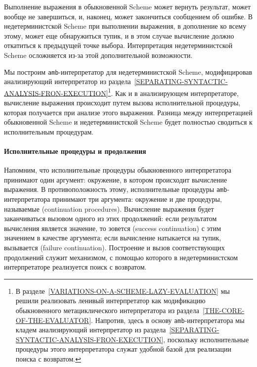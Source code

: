 Выполнение выражения в обыкновенной Scheme может вернуть
результат, может вообще не завершиться, и, наконец, может закончиться сообщением
об ошибке.  В недетерминистской Scheme при выполнении выражения, в
дополнение ко всему этому, может еще обнаружиться тупик, и
в этом случае вычисление должно откатиться к предыдущей точке выбора.
Интерпретация недетерминистской Scheme осложняется из-за этой дополнительной
возможности.

Мы построим {\tt amb}-интерпретатор для
недетерминистской Scheme, модифицировав
анализирующий интерпретатор из
раздела~\ref{SEPARATING-SYNTACTIC-ANALYSIS-FRON-EXECUTION}\footnote{В 
разделе~\ref{VARIATIONS-ON-A-SCHEME-LAZY-EVALUATION}
мы решили реализовать ленивый интерпретатор как модификацию
обыкновенного метациклического интерпретатора из 
раздела~\ref{THE-CORE-OF-THE-EVALUATOR}.  Напротив, здесь в основу
{\tt amb}-интерпретатора мы кладем анализирующий
интерпретатор из 
раздела~\ref{SEPARATING-SYNTACTIC-ANALYSIS-FRON-EXECUTION},
поскольку исполнительные процедуры этого интерпретатора служат удобной
базой для реализации поиска с возвратом.}.
Как и в анализирующем интерпретаторе, вычисление выражения происходит
путем вызова исполнительной процедуры, которая
получается при анализе 
этого выражения.  Разница между интерпретацией обыкновенной Scheme и
недетерминистской Scheme будет полностью сводиться к исполнительным
процедурам.

\paragraph{Исполнительные процедуры и продолжения}

Напомним, что исполнительные процедуры обыкновенного
интерпретатора принимают один аргумент: окружение, в котором
происходит вычисление выражения.   В
противоположность этому, исполнительные процедуры
{\tt amb}-интерпретатора принимают три аргумента: окружение и
две процедуры, называемые   
(continuation procedures).
Вычисление выражения будет заканчиваться вызовом одного из этих 
продолжений:
если результатом вычисления является значение, то зовется
 (success 
continuation) с этим
значением в качестве аргумента; если вычисление натыкается на тупик,
вызывается  (failure continuation).  Построение и вызов соответствующих 
продолжений служит
механизмом, с помощью которого в недетерминистском интерпретаторе
реализуется поиск с возвратом.

